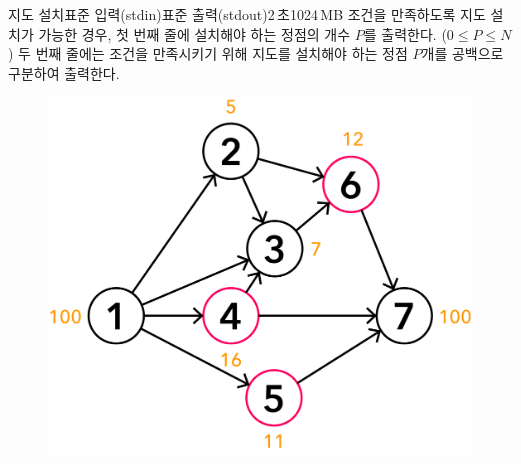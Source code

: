 \begin{problem}{지도 설치}{표준 입력(stdin)}{표준 출력(stdout)}{2\,초}{1024\,MB}
조건을 만족하도록 지도 설치가 가능한 경우, 첫 번째 줄에 설치해야 하는 정점의 개수 $P$를 출력한다. ($0 \leq P \leq N$) \newline
두 번째 줄에는 조건을 만족시키기 위해 지도를 설치해야 하는 정점 $P$개를 공백으로 구분하여 출력한다.

\Examples

\begin{example}
%
%
\end{example}

\begin{figure}[h]
    \begin{center}
        \includegraphics[width=.5\textwidth]{../picture/maps_ex_1.png}
    \end{center}
\end{figure}

\end{problem}
